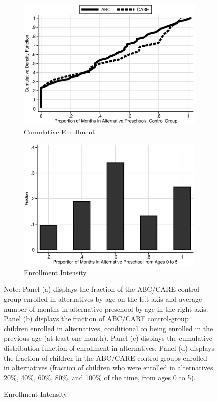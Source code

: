 \begin{figure}
\begin{subfigure}[h]{0.4\textwidth}
		\centering
		\caption{Cumulative Enrollment} \label{fig:treatsubcare}
		\includegraphics[width=\textwidth]{output/abccare_controlcontamination.eps}
\end{subfigure}
\begin{subfigure}[h]{0.4\textwidth}
	\centering
	\caption{Enrollment Intensity} \label{fig:proportion-alt-pre}
		\includegraphics[width=\textwidth]{output/abccare_Vfractimes.eps}
\end{subfigure}%

\footnotesize \justify
Note: Panel (a) displays the fraction of the ABC/CARE control group enrolled in alternatives by age on the left axis and average number of months in alternative preschool by age in the right axis. Panel (b) displays the fraction of ABC/CARE control-group children enrolled in alternatives, conditional on being enrolled in the previous age (at least one month). Panel (c) displays the cumulative distribution function of enrollment in alternatives. Panel (d) displays the fraction of children in the ABC/CARE control groups enrolled in alternatives (fraction of children who were enrolled in alternatives 20\%, 40\%, 60\%, 80\%, and 100\% of the time, from ages 0 to 5). \\
\end{figure}

